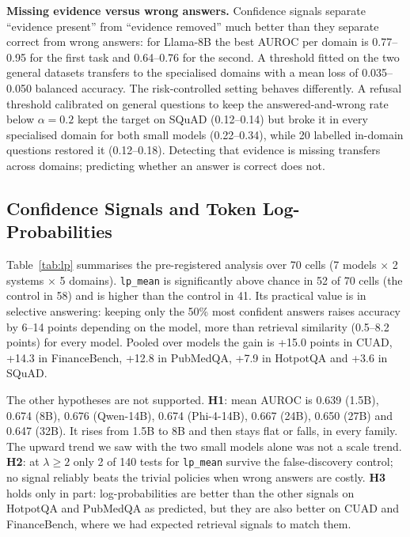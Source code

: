 \documentclass[conference]{IEEEtran}
\newcommand{\m}[1]{\texttt{#1}}   %
\begin{document}
\textbf{Missing evidence versus wrong answers.} Confidence signals separate ``evidence present'' from ``evidence removed'' much better than they
separate correct from wrong answers: for Llama-8B the best AUROC per domain is 0.77--0.95 for the first task and 0.64--0.76 for the second. A threshold
fitted on the two general datasets transfers to the specialised domains with a mean loss of 0.035--0.050 balanced accuracy. The risk-controlled setting
behaves differently. A refusal threshold calibrated on general questions to keep the answered-and-wrong rate below $\alpha=0.2$ \cite{angelopoulos2024crc}
kept the target on SQuAD (0.12--0.14) but broke it in every specialised domain for both small models (0.22--0.34), while 20 labelled in-domain questions
restored it (0.12--0.18). Detecting that evidence is missing transfers across domains; predicting whether an answer is correct does not.

\subsection{Confidence Signals and Token Log-Probabilities}
\label{sec:lp}
Table~\ref{tab:lp} summarises the pre-registered analysis over 70 cells (7 models $\times$ 2 systems $\times$ 5 domains). \m{lp\_mean} is significantly
above chance in 52 of 70 cells (the control in 58) and is higher than the control in 41. Its practical value is in selective answering: keeping only
the 50\% most confident answers raises accuracy by 6--14 points depending on the model, more than retrieval similarity (0.5--8.2 points) for every
model. Pooled over models the gain is +15.0 points in CUAD, +14.3 in FinanceBench, +12.8 in PubMedQA, +7.9 in HotpotQA and +3.6 in SQuAD.

The other hypotheses are not supported. \textbf{H1}: mean AUROC is 0.639 (1.5B), 0.674 (8B), 0.676 (Qwen-14B), 0.674 (Phi-4-14B), 0.667 (24B),
0.650 (27B) and 0.647 (32B). It rises from 1.5B to 8B and then stays flat or falls, in every family. The upward trend we saw with the two small models
alone was not a scale trend. \textbf{H2}: at $\lambda\geq2$ only 2 of 140 tests for \m{lp\_mean} survive the false-discovery control; no signal
reliably beats the trivial policies when wrong answers are costly. \textbf{H3} holds only in part: log-probabilities are better than the other signals
on HotpotQA and PubMedQA as predicted, but they are also better on CUAD and FinanceBench, where we had expected retrieval signals to match them.
\end{document}
